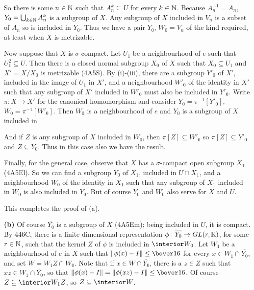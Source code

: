 {\medskip

 So there is some $n\in\Bbb N$ such that
$A_n^k\subseteq U$ for every $k\in\Bbb N$.   Because $A_n^{-1}=A_n$,
$Y_0=\bigcup_{k\in\Bbb N}A_n^k$ is a subgroup of $X$.
Any subgroup of $X$ included in $V_n$ is a subset of $A_n$ so is
included in $Y_0$.   Thus we have a pair $Y_0$, $W_0=V_n$ of the kind
required, at least when $X$ is metrizable.

\medskip

 Now suppose that $X$ is $\sigma$-compact.   Let $U_1$ be
a neighbourhood of $e$ such that $U_1^2\subseteq U$.   Then there is a
closed normal subgroup $X_0$ of $X$ such that $X_0\subseteq U_1$ and
$X'=X/X_0$ is metrizable (4A5S).   By (i)-(iii), there are a subgroup
$Y'_0$ of $X'$, included in the image of $U_1$ in $X'$, and a
neighbourhood $W'_0$ of the identity in $X'$ such that any subgroup of
$X'$ included in $W'_0$ must also be included in $Y'_0$.   Write
$\pi:X\to X'$ for the canonical homomorphism and consider
$Y_0=\pi^{-1}[Y'_0]$, $W_0=\pi^{-1}[W'_0]$.   Then $W_0$ is a
neighbourhood of $e$ and $Y_0$ is a subgroup of $X$ included in


\noindent And if $Z$ is any subgroup of $X$ included in $W_0$, then
$\pi[Z]\subseteq W'_0$ so $\pi[Z]\subseteq Y'_0$ and $Z\subseteq Y_0$.
Thus in this case also we have the result.

\medskip

 Finally, for the general case, observe that $X$ has a
$\sigma$-compact open subgroup $X_1$ (4A5El).   So we can find a
subgroup
$Y_0$ of $X_1$, included in $U\cap X_1$, and a neighbourhood $W_0$ of
the identity in $X_1$ such that any subgroup of $X_1$ included in $W_0$
is also included in $Y_0$.   But of course $Y_0$ and $W_0$ also serve
for $X$ and $U$.

This completes the proof of (a).\ \Qed

\medskip

{\bf (b)} Of course $\overline{Y_0}$ is a subgroup of $X$ (4A5Em);
being included in $U$, it is compact.
By 446C, there is a finite-dimensional representation
$\phi:\overline{Y_0}\to GL(r,\Bbb R)$, for some $r\in\Bbb N$, such that the kernel
$Z$ of $\phi$ is included in $\interior W_0$.   Let $W_1$ be a
neighbourhood of $e$ in $X$ such that $\|\phi(x)-I\|\le\bover16$ for
every $x\in W_1\cap \overline{Y_0}$, and set $W=W_1Z\cap W_0$.   Note that if
$x\in W\cap\overline{Y_0}$, there is a $z\in Z$ such that $xz\in W_1\cap \overline{Y_0}$, so that
$\|\phi(x)-I\|=\|\phi(xz)-I\|\le\bover16$.   Of course
$Z\subseteq\interior W_1Z$, so $Z\subseteq\interior W$.

}
